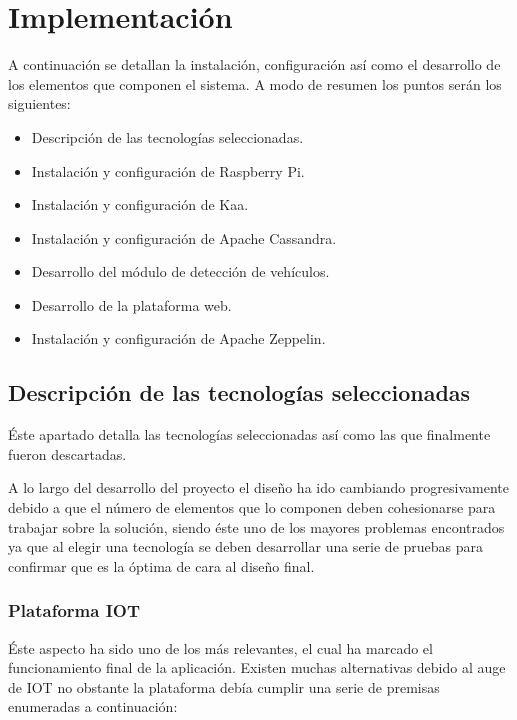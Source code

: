 \chapter{Implementación}
\label{chap6}


A continuación se detallan la instalación, configuración así como el desarrollo de los elementos que componen el sistema. A modo de resumen los puntos serán los siguientes:

\begin{itemize}
	\item Descripción de las tecnologías seleccionadas.
	\item Instalación y configuración de Raspberry Pi.
	\item Instalación y configuración de Kaa.
	\item Instalación y configuración de Apache Cassandra.
	\item Desarrollo del módulo de detección de vehículos.
	\item Desarrollo de la plataforma web.
	\item Instalación y configuración de Apache Zeppelin.
\end{itemize}


\section{ Descripción de las tecnologías seleccionadas}

Éste apartado detalla las tecnologías seleccionadas así como las que finalmente fueron descartadas.

A lo largo del desarrollo del proyecto el diseño ha ido cambiando progresivamente debido a que el número de elementos que lo componen deben cohesionarse para trabajar sobre la solución, siendo éste uno de los mayores problemas encontrados ya que al elegir una tecnología se deben desarrollar una serie de pruebas para confirmar que es la óptima de cara al diseño final.

\newpage

\subsection{Plataforma IOT}

Éste aspecto ha sido uno de los más relevantes, el cual ha marcado el funcionamiento final de la aplicación. Existen muchas alternativas debido al auge de IOT no obstante la plataforma debía cumplir una serie de premisas enumeradas a continuación:

